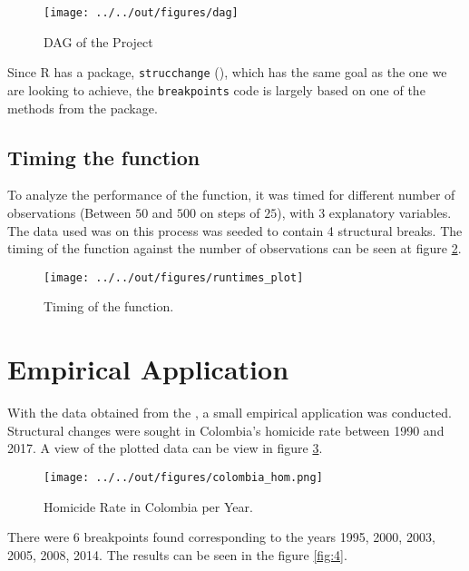 \documentclass[11pt, a4paper, leqno]{article}
\begin{document}
\begin{figure}[h]

    \texttt{[image: ../../out/figures/dag]}
    \caption{DAG of the Project}
    \label{fig:1}

\end{figure}

Since R has a package, \texttt{strucchange} (\citealt{zeileis2019strucchange}), which has the same goal as the one we are looking to achieve, the \texttt{breakpoints} code is largely based on one of the methods from the package.

\subsection{Timing the function}

To analyze the performance of the function, it was timed for different number of observations (Between $50$ and $500$ on steps of $25$), with $3$ explanatory variables.  The data used was on this process was seeded to contain 4 structural breaks. The timing of the function against the number of observations can be seen at figure \ref{fig:2}.

\begin{figure}[h]

    \texttt{[image: ../../out/figures/runtimes\_plot]}
    \caption{Timing of the function.}
    \label{fig:2}

\end{figure}


\section{Empirical Application}
\label{sec:empirical}

With the data obtained from the \cite{world2017homicides}, a small empirical application was conducted. Structural changes were sought in Colombia's homicide rate between 1990 and 2017. A view of the plotted data can be view in figure \ref{fig:3}.

\begin{figure}[ht]
    \centering
    \texttt{[image: ../../out/figures/colombia\_hom.png]}
    \caption{Homicide Rate in Colombia per Year.}
    \label{fig:3}

\end{figure}

There were 6 breakpoints found corresponding to the years 1995, 2000, 2003, 2005, 2008, 2014.  The results can be seen in the figure \ref{fig:4}.
\end{document}

